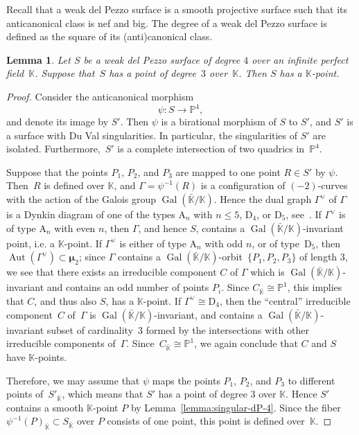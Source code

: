 \documentclass[12pt]{amsart}
\newcounter{cequation}[section]
\newtheorem{lemma}[cequation]{Lemma}
\theoremstyle{definition}
\theoremstyle{remark}
\newcommand{\PP}{\mathbb{P}}
\newcommand{\KK}{\mathbb{K}}
\newcommand{\mumu}{{\boldsymbol{\mu}}}
\newcommand{\Aut}{\operatorname{Aut}}
\newcommand{\Gal}{\operatorname{Gal}}
\def \le {\leqslant}
\begin{document}
Recall that a weak del Pezzo surface is a smooth projective surface
such that its anticanonical class is nef and big. The degree of a weak del Pezzo surface is
defined as the square of its (anti)canonical class.

\begin{lemma}
\label{lemma:weak-dP-4}
Let $S$ be a weak del Pezzo surface of degree $4$ over an infinite perfect field~$\KK$. Suppose that~$S$
has a point of degree~$3$ over~$\KK$. Then $S$ has a $\KK$-point.
\end{lemma}

\begin{proof}
Consider the anticanonical morphism
$$
\psi\colon S\to \PP^4,
$$
and denote its image by $S'$. Then
$\psi$ is a birational
morphism of $S$ to $S'$, and $S'$ is a surface with Du Val singularities.
In particular, the singularities of $S'$ are isolated. Furthermore,~$S'$ is a complete
intersection of two quadrics in~$\PP^4$.


Suppose that the points $P_1$, $P_2$, and $P_3$ are
mapped to one point $R\in S'$ by $\psi$. Then~$R$ is defined over $\KK$, and
$\Gamma=\psi^{-1}(R)$ is a configuration of $(-2)$-curves with the action
of the Galois group $\Gal(\bar{\KK}/\KK)$. Hence the dual graph $\Gamma^\vee$ of $\Gamma$ is a Dynkin diagram
of one of the types $\mathrm{A}_n$ with $n\le 5$, $\mathrm{D}_4$, or $\mathrm{D}_5$,
see~\mbox{\cite[\S8.6.3]{Dolgachev}}.
If $\Gamma^\vee$ is of type $\mathrm{A}_n$ with even $n$, then $\Gamma$, and hence $S$, contains a 
$\Gal(\bar{\KK}/\KK)$-invariant point, i.e. a $\KK$-point.
If $\Gamma^\vee$ is either of type $\mathrm{A}_n$ with odd $n$, or of type~$\mathrm{D}_5$, then 
$\Aut(\Gamma^\vee)\subset \mumu_2$; since $\Gamma$ contains a $\Gal(\bar{\KK}/\KK)$-orbit~\mbox{$\{P_1, P_2, P_3\}$} of length $3$, we see that
there exists an irreducible component $C$ of $\Gamma$ which is $\Gal(\bar{\KK}/\KK)$-invariant
and contains an odd number of points $P_i$. Since $C_{\bar{\KK}}\cong\PP^1$, this implies that $C$,
and thus also $S$, has a $\KK$-point.
If $\Gamma^\vee\cong \mathrm{D}_4$, then the ``central'' irreducible component~$C$ of~$\Gamma$
is $\Gal(\bar{\KK}/\KK)$-invariant, and contains a $\Gal(\bar{\KK}/\KK)$-invariant subset of cardinality~$3$
formed by the intersections with other irreducible components of~$\Gamma$.
Since~\mbox{$C_{\bar{\KK}}\cong\PP^1$}, we again
conclude that $C$ and $S$ have $\KK$-points.


Therefore, we may assume that $\psi$ maps the points $P_1$, $P_2$, and $P_3$
to different points of~$S'_{\bar{\KK}}$, which means that $S'$ has a point of degree $3$ over $\KK$.
Hence $S'$ contains a smooth $\KK$-point $P$ by
Lemma~\ref{lemma:singular-dP-4}. Since the fiber
$\psi^{-1}(P)_{\bar{\KK}}\subset S_{\bar{\KK}}$ over $P$ consists of one point,
this point is defined over~$\KK$.
\end{proof}
\end{document}

